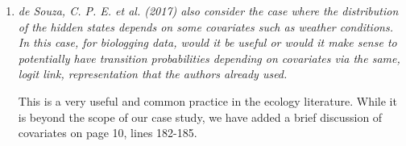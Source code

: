 \documentclass{article}
\begin{document}
\begin{enumerate}
    \item \textit{de Souza, C. P. E. et al. (2017) also consider the case where the distribution of the hidden states depends on some covariates such as weather conditions. In this case, for biologging data, would it be useful or would it make sense to potentially have transition probabilities depending on covariates via the same, logit link, representation that the authors already used.}
    
    This is a very useful and common practice in the ecology literature. While it is beyond the scope of our case study, we have added a brief discussion of covariates on page 10, lines 182-185.
    
\end{enumerate}
\end{document}
